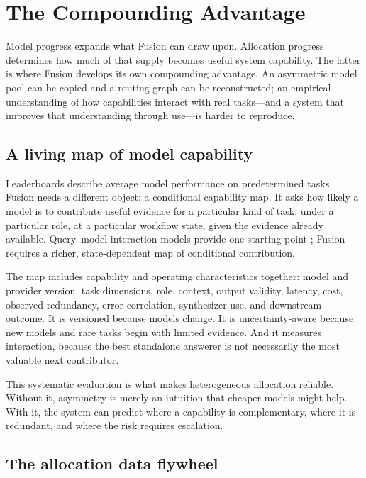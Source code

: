 \section{The Compounding Advantage}
\label{sec:learning}

Model progress expands what Fusion can draw upon. Allocation progress determines
how much of that supply becomes useful system capability. The latter is where
Fusion develops its own compounding advantage. An asymmetric model pool can be
copied and a routing graph can be reconstructed; an empirical understanding of
how capabilities interact with real tasks---and a system that improves that
understanding through use---is harder to reproduce.

\subsection{A living map of model capability}

Leaderboards describe average model performance on predetermined tasks. Fusion
needs a different object: a conditional capability map. It asks how likely a
model is to contribute useful evidence for a particular kind of task, under a
particular role, at a particular workflow state, given the evidence already
available. Query--model interaction models provide one starting point
\citep{song2025irtrouter}; Fusion requires a richer, state-dependent map of
conditional contribution.

The map includes capability and operating characteristics together: model and
provider version, task dimensions, role, context, output validity, latency,
cost, observed redundancy, error correlation, synthesizer use, and downstream
outcome. It is versioned because models change. It is uncertainty-aware because
new models and rare tasks begin with limited evidence. And it measures
interaction, because the best standalone answerer is not necessarily the most
valuable next contributor.

This systematic evaluation is what makes heterogeneous allocation reliable.
Without it, asymmetry is merely an intuition that cheaper models might help.
With it, the system can predict where a capability is complementary, where it
is redundant, and where the risk requires escalation.

\subsection{The allocation data flywheel}


